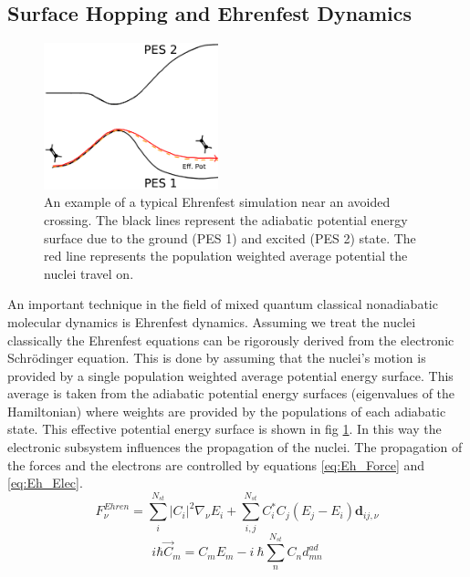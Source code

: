 \subsection{Surface Hopping and Ehrenfest Dynamics \label{sec:Ehren_SH}}
\begin{figure}
  \includegraphics[width=0.45\textwidth]{./img/Eh_hop.png}
  \caption{\label{fig:Eh_diag}An example of a typical Ehrenfest simulation near an avoided crossing. The black lines represent the adiabatic potential energy surface due to the ground (PES 1) and excited (PES 2) state. The red line represents the population weighted average potential the nuclei travel on.}
\end{figure}
An important technique in the field of mixed quantum classical nonadiabatic molecular dynamics is Ehrenfest dynamics. Assuming we treat the nuclei classically the Ehrenfest equations can be rigorously derived from the electronic Schr\"odinger equation. This is done by assuming that the nuclei's motion is provided by a single population weighted average potential energy surface. This average is taken from the adiabatic potential energy surfaces (eigenvalues of the Hamiltonian) where weights are provided by the populations of each adiabatic state. This effective potential energy surface is shown in fig \ref{fig:Eh_diag}. In this way the electronic subsystem influences the propagation of the nuclei. The propagation of the forces and the electrons are controlled by equations \eqref{eq:Eh_Force} and \eqref{eq:Eh_Elec}.
\\
\begin{equation}
  F_{\nu}^{Ehren} = \sum_i^{N_{st}} |C_{i}|^2 \nabla_{\nu} E_{i} + \sum_{i,j}^{N_{st}} C_{i}^{*} C_{j} (E_{j} - E_{i}) \textbf{d}_{ij, \nu}
  \label{eq:Eh_Force}
\end{equation}
\begin{equation}
  i \hbar \vec{C}_{m} = C_{m}E_{m} -  i \ \hbar  \sum_{n}^{N_{st}} C_{n} d^{ad}_{mn}
  \label{eq:Eh_Elec}
\end{equation}
